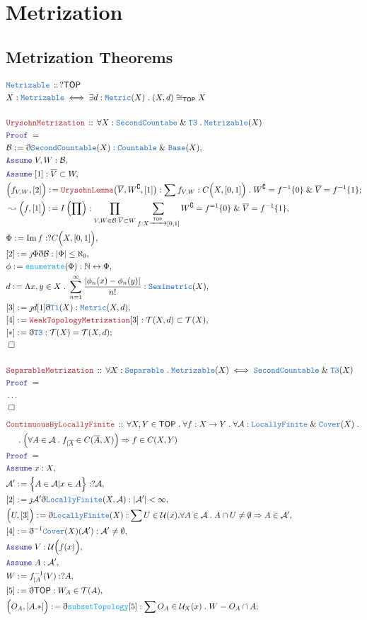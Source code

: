 \documentclass[12pt]{scrartcl}
\newcommand{\TYPE}[1]{\textcolor{NavyBlue}{\mathtt{#1}}}
\newcommand{\FUNC}[1]{\textcolor{Cerulean}{\mathtt{#1}}}
\newcommand{\LOGIC}[1]{\textcolor{Blue}{\mathtt{#1}}}
\newcommand{\THM}[1]{\textcolor{Maroon}{\mathtt{#1}}}
\renewcommand{\.}{\; . \;}
\newcommand{\de}{: \kern 0.1pc =}
\newcommand{\Act}[1]{\left( #1 \right)}
\newcommand{\Theorem}[2]{& \THM{#1} \, :: \, #2 \\ & \Proof = \\ }
\newcommand{\DeclareType}[2]{& \TYPE{#1} \, :: \, #2 \\}
\newcommand{\DefineType}[3]{& #1 : \TYPE{#2} \iff #3 \\}
\newcommand{\NewLine}{\\ & \kern 1pc}
\newcommand{\Page}[1]{ \begin{align*} #1 \end{align*}   }
\newcommand{ \bd }{ \ByDef }
\newcommand{\NoProof}{ & \ldots \\ \EndProof}
\renewcommand{\And}{\; \& \;}
\newcommand{\Imply}{\Rightarrow}
\newcommand{\Nat}{\mathbb{N} }
\DeclareMathOperator*{\im}{Im}
\newcommand{\ToBij}{\leftrightarrow}
\newcommand{\Arrow}{\xrightarrow}
\renewcommand{\c}{\complement}
\newcommand{\Say}[3]{& #1 \de #2 : #3, \\}
\newcommand{\Conclude}[3]{& #1 \de #2 : #3; \\}
\newcommand{\Derive}[3]{& \leadsto #1 \de #2 : #3, \\}
\newcommand{\Assume}[2]{& \LOGIC{Assume} \; #1 : #2, \\}
\newcommand{\QED}{\; \square}
\newcommand{\EndProof}{& \QED \\}
\newcommand{\ByDef}{\eth}
\newcommand{\ByConstr}{\jmath}
\newcommand{\Proof}{\LOGIC{Proof} \; }
\newcommand{\A}{\mathcal{A}}
\newcommand{\B}{\mathcal{B}}
\newcommand{\TOP}{\mathsf{TOP}}
\newcommand{\T}{\mathcal{T}}
\newcommand{\U}{\mathcal{U}}
\begin{document}
\section{Metrization}
\subsection{Metrization Theorems}
\Page{
	\DeclareType{Metrizable}{?\TOP}
	\DefineType{X}{Metrizable}{\exists d : \TYPE{Metric}(X) \. (X,d) \cong_{\TOP} X}
	\\
	\Theorem{UrysohnMetrization}{\forall X : \TYPE{SecondCountabe} \And \TYPE{T3} \. \TYPE{Metrizable}(X)}
	\Say{\mathcal{B}}{\bd \TYPE{SecondCountable}(X)}{\TYPE{Countable} \And \TYPE{Base}(X)}
	\Assume{V,W}{\B}
	\Assume{[1]}{\overline{V} \subset W}
	\Conclude{\Big(f_{V,W},[2]\Big)}{\THM{UrysohnLemma}\big(\overline{V},W^\c,[1]\big)}{\sum f_{V,W} : C\Big(X,[0,1]\Big) \. W^\c =f^{-1}\{0\}  \And \overline{V} = f^{-1}\{1\}}
	\Derive{\Big(f,[1]\Big)}{I\Act{\prod}}{\prod_{V,W \in \B : \overline{V} \subset W} \sum_{f : X \Arrow{\TOP} [0,1]} W^\c = f^{=1}\{0\} \And  \overline{V} = f^{-1}\{1\}  }
	\Say{\Phi}{\im f}{?C\Big(X,[0,1]\Big)}
	\Say{[2]}{\ByConstr \Phi \bd \B}{|\Phi| \le \aleph_0}
	\Say{\phi}{\FUNC{enumerate}(\Phi)}{\Nat \ToBij \Phi}
	\Say{d}{\Lambda x,y \in X \. \sum^\infty_{n=1} \frac{|\phi_n(x) - \phi_n(y)|}{n!}}{\TYPE{Semimetric}(X)}
	\Say{[3]}{\ByConstr d [1] \bd \TYPE{T1}(X)}{\TYPE{Metric}(X,d)}
	\Say{[4]}{\THM{WeakTopologyMetrization}[3]}{ \T(X,d) \subset \T(X) }
	\Conclude{[*]}{\bd \TYPE{T3}}{\T(X) = \T(X,d)}
	\EndProof
	\\
	\Theorem{SeparableMetrization}{\forall X : \TYPE{Separable} \.  \TYPE{Metrizable}(X) \iff \TYPE{SecondCountable} \And \TYPE{T3}(X)   }
	\NoProof
}\Page{
	\Theorem{ContinuousByLocallyFinite}{
		\forall X,Y \in \TOP \. 
		\forall f : X \to Y \. 
		\forall \A : \TYPE{LocallyFinite} \And \TYPE{Cover}(X) \. \NewLine \.
		\Big( \forall A \in \A \. f_{|\overline{A}} \in C(\overline{A},X) \Big) \Imply
		f \in C(X,Y)
	}
	\Assume{x}{X}
	\Say{\A'}{\Big\{ A \in \A |  x \in A  \Big\}}{?\A}
	\Say{[2]}{\ByConstr \A' \bd  \TYPE{LocallyFinite}(X,\A)}{|\A'| < \infty}
	\Say{\Big(U,[3]\Big)}{\bd \TYPE{LocallyFinite}(X)}{\sum U \in \U(x) . \forall  A \in \A \. A \cap U \neq \emptyset \Imply A \in \A'  }
	\Say{[4]}{\bd^{-1} \TYPE{Cover}(X)(\A')}{\A' \neq \emptyset}
	\Assume{V}{\U\Big(f(x)\Big)}
	\Assume{A}{\A'}
	\Say{W}{f_{|A}^{-1}(V)}{?A}
	\Say{[5]}{\bd \TOP}{W_A  \in \T(A) }
	\Conclude{\Big(O_A,[A.*] \Big)}{\bd \FUNC{subsetTopology}[5]}{ \sum O_A \in \U_X(x) \. W = O_A \cap A }
}
\end{document}
